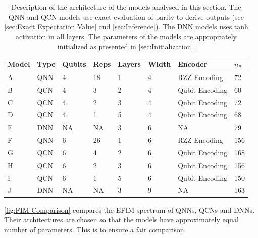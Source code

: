 \begin{table}[H]
\caption{Description of the architecture of the models analysed in this section. The QNN and QCN models use exact evaluation of parity to derive outputs (see \autoref{sec:Exact Expectation Value} and \autoref{sec:Inference}). The DNN models uses tanh activation in all layers. The parameters of the models are appropriately initialized as presented in \autoref{sec:Initialization}.} 
\centering
\begin{tabular}{|l|l|l|l|l|l|l|l|}
\hline
Model &Type & Qubits& Reps & Layers & Width & Encoder        & $n_{\theta}$ \\ \hline
A    & QNN & 4& 18   & 1      & 4     & RZZ Encoding   & 72  \\ \hline
B    & QCN & 4& 3    & 2      & 4     & Qubit Encoding & 60 \\ \hline
C    & QCN & 4& 2    & 3      & 4     & Qubit Encoding & 72  \\ \hline
D    & QCN & 4& 1    & 5      & 4     & Qubit Encoding & 68  \\ \hline
E    & DNN & NA& NA   & 3      & 6     & NA             & 79 \\ \hline
F    & QNN & 6& 26   & 1      & 6     & RZZ Encoding   & 156  \\ \hline
G    & QCN & 6& 4    & 2      & 6     & Qubit Encoding & 168 \\ \hline
H    & QCN & 6& 2    & 3      & 6     & Qubit Encoding & 156  \\ \hline
I    & QCN & 6& 1    & 5      & 6     & Qubit Encoding & 150  \\ \hline
J    & DNN & NA& NA   & 3      & 9     & NA             & 163 \\ \hline
\end{tabular}
\label{tab:FIM models}
\end{table}

\autoref{fig:FIM Comparison} compares the EFIM spectrum of QNNs, QCNs and DNNs. Their architectures are chosen so that the models have approximately equal number of parameters. This is to ensure a fair comparison. 

